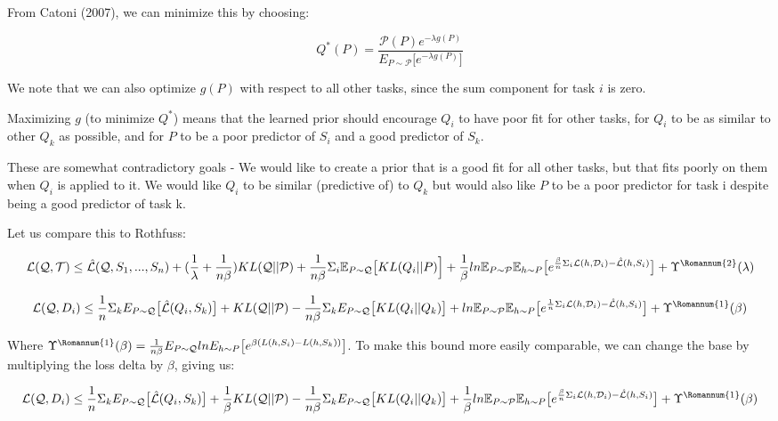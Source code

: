 \documentclass[letterpaper]{article}
\theoremstyle{definition}
\begin{document}
From Catoni (2007), we can minimize this by choosing:

$$Q^{*}(P)=\frac{\mathcal{P}(P) e^{-\lambda g(P)}}{E_{P\sim \mathcal{P}} \bigl [ e^{-\lambda g(P) } \bigr ]}$$

We note that we can also optimize $g(P)$ with respect to all other tasks, since the sum component for task $i$ is zero.

Maximizing $g$ (to minimize $Q^{*}$) means that the learned prior should encourage $Q_i$ to have poor fit for other tasks, for $Q_i$ to be as similar to other $Q_k$ as possible, and for $P$ to be a poor predictor of $S_i$ and a good predictor of $S_k$. 

These are somewhat contradictory goals - We would like to create a prior that is a good fit for all other tasks, but that fits poorly on them when $Q_i$ is applied to it. We would like $Q_i$ to be similar (predictive of) to $Q_k$ but would also like $P$ to be a poor predictor for task i despite being a good predictor of task k.

Let us compare this to Rothfuss:

$$\mathcal{L}(\mathcal{Q}, \mathcal{T}) \leq \hat{\mathcal{L}}(\mathcal{Q}, S_1,...,S_n) + (\frac{1}{\lambda}+\frac{1}{n\beta}) KL(\mathcal{Q}||\mathcal{P}) + \frac{1}{n\beta}\Sigma_i \mathbb{E}_{P\sim \mathcal{Q}} \bigl [KL(Q_i||P) \Bigr ] + \frac{1}{\beta}ln\mathbb{E}_{P\sim \mathcal{P}}\mathbb{E}_{h\sim P}\bigl [ e^{\frac{\beta}{n}\Sigma_i\mathcal{L}(h,\mathcal{D}_i)- \hat{\mathcal{L}}(h, S_i)} \bigr ] +\Upsilon^{\text{\Romannum{2}}}(\lambda)$$

$$ \mathcal{L}(\mathcal{Q}, D_i)\leq \frac{1}{n}\Sigma_k E_{P\sim \mathcal{Q}} \bigl [ \hat{\mathcal{L}}(Q_i,S_k) \bigr ] +  KL(\mathcal{Q}||\mathcal{P}) - \frac{1}{n\beta} \Sigma_k E_{P\sim \mathcal{Q}} \bigl [ KL(Q_i||Q_k) \bigr ] + ln\mathbb{E}_{P\sim \mathcal{P}}\mathbb{E}_{h\sim P}\bigl [ e^{\frac{1}{n}\Sigma_i\mathcal{L}(h,\mathcal{D}_i)- \hat{\mathcal{L}}(h, S_i)} \bigr ]
 + \Upsilon^{\text{\Romannum{1}}}(\beta) $$

Where $\Upsilon^{\text{\Romannum{1}}}(\beta)=\frac{1}{n\beta} E_{P\sim \mathcal{Q}} ln E_{h\sim P}\bigl [e^{\beta (L(h,S_i)-L(h,S_k))} \bigr ] $. To make this bound more easily comparable, we can change the base by multiplying the loss delta by $\beta$, giving us:

$$ \mathcal{L}(\mathcal{Q}, D_i)\leq \frac{1}{n}\Sigma_k E_{P\sim \mathcal{Q}} \bigl [ \hat{\mathcal{L}}(Q_i,S_k) \bigr ] +  \frac{1}{\beta} KL(\mathcal{Q}||\mathcal{P}) - \frac{1}{n\beta} \Sigma_k E_{P\sim \mathcal{Q}} \bigl [ KL(Q_i||Q_k) \bigr ] + \frac{1}{\beta} ln\mathbb{E}_{P\sim \mathcal{P}}\mathbb{E}_{h\sim P}\bigl [ e^{\frac{\beta}{n}\Sigma_i\mathcal{L}(h,\mathcal{D}_i)- \hat{\mathcal{L}}(h, S_i)} \bigr ]
+ \Upsilon^{\text{\Romannum{1}}}(\beta) $$
\end{document}
